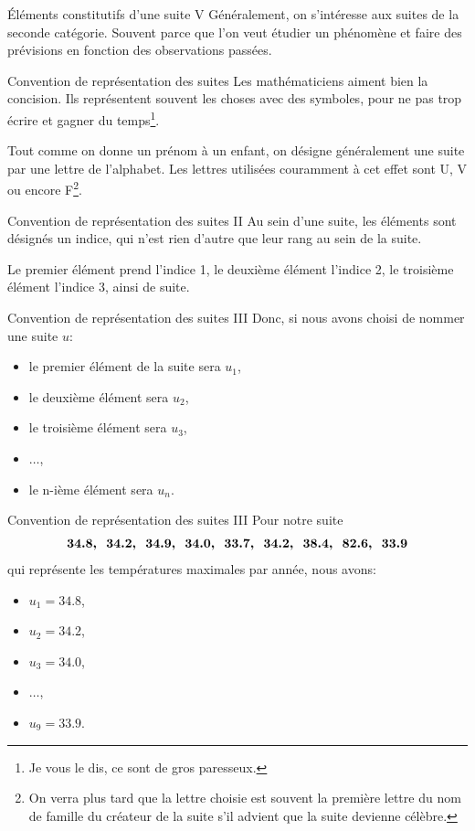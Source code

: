 \documentclass{beamer}
\begin{document}
\begin{frame}{\'{E}léments constitutifs d'une suite V}
  Généralement, on s'intéresse aux suites de la seconde catégorie. Souvent parce que l'on veut étudier un phénomène et faire des prévisions en fonction des observations passées.
\end{frame}

\begin{frame}{Convention de représentation des suites}
Les mathématiciens aiment bien la concision. Ils représentent souvent les choses avec des symboles, pour ne pas trop écrire et gagner du temps\footnote{Je vous le dis, ce sont de gros paresseux.}.

Tout comme on donne un prénom à un enfant, on désigne généralement une suite par une lettre de l'alphabet. Les lettres utilisées couramment à cet effet sont U, V ou encore F\footnote{On verra plus tard que la lettre choisie est souvent la première lettre du nom de famille du créateur de la suite s'il advient que la suite devienne célèbre.}.
\end{frame}

\begin{frame}{Convention de représentation des suites II}
  Au sein d'une suite, les éléments sont désignés un indice, qui n'est rien d'autre que leur rang au sein de la suite.

  Le premier élément prend l'indice 1, le deuxième élément l'indice 2, le troisième élément l'indice 3, ainsi de suite.
\end{frame}

\begin{frame}{Convention de représentation des suites III}
  Donc, si nous avons choisi de nommer une suite $u$:
  \begin{itemize}
    \item le premier élément de la suite sera $u_1$,
    \item le deuxième élément sera $u_2$,
    \item le troisième élément sera $u_3$,
    \item $\dots$,
    \item le n-ième élément sera $u_n$.
  \end{itemize} 
\end{frame}

\begin{frame}{Convention de représentation des suites III}
  Pour notre suite
  \begin{align*}
    \footnotesize
    \bm{34.8,\ \ 34.2,\ \ 34.9,\ \ 34.0,\ \ 33.7,\ \ 34.2,\ \ 38.4,\ \ 82.6,\ \ 33.9}
  \end{align*}
  qui représente les températures maximales par année, nous avons:
  \begin{itemize}
    \item $u_1 = 34.8$,
    \item $u_2 = 34.2$,
    \item $u_3 = 34.0$,
    \item $\dots$,
    \item $u_9 = 33.9$.
  \end{itemize} 
\end{frame}
\end{document}
